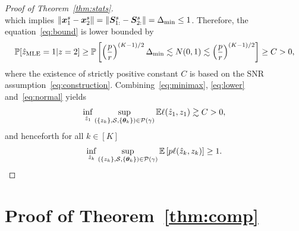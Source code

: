 \documentclass[lettersize,onecolumn,journal]{IEEEtran}
\theoremstyle{definition}
\theoremstyle{definition}
\begin{document}
\begin{proof}[Proof of Theorem~\ref{thm:stats}]
\begin{equation}
\end{equation}
which implies $\lVert\bm x^s_1-\bm x^s_2\rVert = \lVert\bm S_{1:}^s-\bm S_{2:}^s\rVert = \Delta_{\min} \leq 1$. Therefore, the equation~\eqref{eq:bound} is lower bounded by
\begin{equation}\label{eq:normal}
\bbP[\hat z_{\text{MLE}}=1|z=2] \geq \bbP\left[ \left({p\over r}\right)^{(K-1)/2}\Delta_{\min}\lesssim N(0,1)\lesssim  \left({p\over r}\right)^{(K-1)/2} \right]\geq C>0,
\end{equation}
 where the existence of strictly positive constant $C$ is based on the SNR assumption~\eqref{eq:construction}. Combining~\eqref{eq:minimax}, \eqref{eq:lower} and~\eqref{eq:normal} yields
\[
\inf_{\hat z_1}\sup_{(\{z_k\},\mathcal{S},\{\boldsymbol{\theta}_k\})\in \mathcal{P}(\gamma)}\mathbb{E}\ell(\hat z_1, z_1)\gtrsim C>0, 
\]
and henceforth for all $k \in [K]$
\[
\inf_{\hat z_k}\sup_{(\{z_k\},\mathcal{S},\{\boldsymbol{\theta}_k\})\in \mathcal{P}(\gamma)}\mathbb{E} \left[p\ell(\hat z_k, z_k)\right]\geq 1.
\]

\end{proof}



\section*{Proof of Theorem~\ref{thm:comp}}
\end{document}
